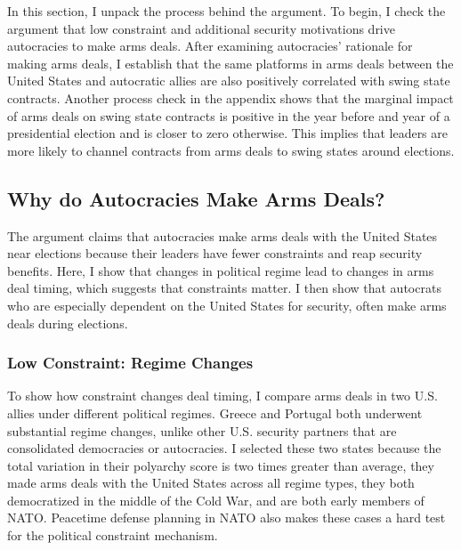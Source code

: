 \documentclass[12pt]{article}
\begin{document}
In this section, I unpack the process behind the argument.  
To begin, I check the argument that low constraint and additional security motivations drive autocracies to make arms deals.
After examining autocracies' rationale for making arms deals, I establish that the same platforms in arms deals between the United States and autocratic allies are also positively correlated with swing state contracts.
Another process check in the appendix shows that the marginal impact of arms deals on swing state contracts is positive in the year before and year of a presidential election and is closer to zero otherwise.
This implies that leaders are more likely to channel contracts from arms deals to swing states around elections. 



\subsection{Why do Autocracies Make Arms Deals?}


The argument claims that autocracies make arms deals with the United States near elections because their leaders have fewer constraints and reap security benefits. 
Here, I show that changes in political regime lead to changes in arms deal timing, which suggests that constraints matter. 
I then show that autocrats who are especially dependent on the United States for security, often make arms deals during elections.


\subsubsection{Low Constraint: Regime Changes}


To show how constraint changes deal timing, I compare arms deals in two U.S. allies under different political regimes. 
Greece and Portugal both underwent substantial regime changes, unlike other U.S. security partners that are consolidated democracies or autocracies. 
I selected these two states because the total variation in their polyarchy score is two times greater than average, they made arms deals with the United States across all regime types, they both democratized in the middle of the Cold War, and are both early members of NATO. 
Peacetime defense planning in NATO also makes these cases a hard test for the political constraint mechanism.
\end{document}
